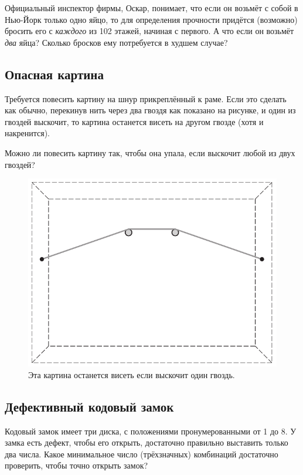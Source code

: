 Официальный инспектор фирмы, Оскар, понимает, что если он возьмёт с собой в Нью-Йорк только одно яйцо,
то для определения прочности придётся (возможно) бросить его с \emph{каждого} из 102 этажей, начиная с первого.
А что если он возьмёт \emph{два} яйца?
Сколько бросков ему потребуется в худшем случае?

\subsection*{Опасная картина}

Требуется повесить картину на шнур прикреплённый к раме.
Если это сделать как обычно, перекинув нить через два гвоздя как показано на рисунке, и один из гвоздей выскочит, то картина останется висеть на другом гвозде (хотя и накренится).

Можно ли повесить картину так, чтобы она упала, если выскочит любой из двух гвоздей?

\begin{figure}[h!]
\centering
\includegraphics[scale=0.5]{pics/kartina1}
\caption{Эта картина останется висеть если выскочит один гвоздь.}
\end{figure}

\subsection*{Дефективный кодовый замок}

Кодовый замок имеет три диска, с положениями пронумерованными от 1 до 8.
У замка есть дефект, чтобы его открыть, достаточно правильно выставить только два числа.
Какое минимальное число (трёхзначных) комбинаций достаточно проверить, чтобы точно открыть замок?

